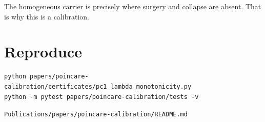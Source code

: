 The homogeneous carrier is precisely where surgery and collapse are
absent. That is why this is a calibration.

\hypertarget{reproduce}{%
\section{Reproduce}\label{reproduce}}

\begin{verbatim}
python papers/poincare-calibration/certificates/pc1_lambda_monotonicity.py
python -m pytest papers/poincare-calibration/tests -v
\end{verbatim}

\begin{flushright}\small\texttt{Publications/papers/poincare-calibration/README.md}\end{flushright}
